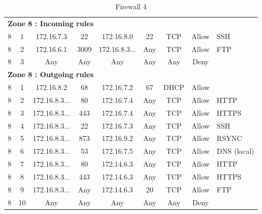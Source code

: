 \documentclass[a4paper,titlepage]{article}
\begin{document}
\begin{landscape}
\begin{table}[h]
\begin{tabular}{c|c|cc|cc|ccl}
			\hline
			\multicolumn{9}{l}{\textbf{Zone 8 : Incoming rules}}\\
			8 & 1 & 172.16.7.3 & 22 & 172.16.8.0 & 22 & TCP & Allow & SSH \\
			8 & 2 & 172.16.6.1 & 3009 & 172.16.8.3... & Any & TCP & Allow & FTP \\
			8 & 3 & Any & Any & Any & Any & Any & Deny & \\
			\hline
			\multicolumn{9}{l}{\textbf{Zone 8 : Outgoing rules}}\\
			8 & 1 & 172.16.8.2 & 68 & 172.16.7.2 & 67 & DHCP & Allow & \\
			8 & 2 & 172.16.8.3... & 80 & 172.16.7.4 & Any & TCP & Allow & HTTP \\
			8 & 3 & 172.16.8.3... & 443 & 172.16.7.4 & Any & TCP & Allow & HTTPS \\
			8 & 4 & 172.16.8.3... & 22 & 172.16.7.3 & Any & TCP & Allow & SSH \\
			8 & 5 & 172.16.8.3... & 873 & 172.16.9.2 & Any & TCP & Allow & RSYNC \\
			8 & 6 & 172.16.8.3... & 53 & 172.16.7.5 & Any & TCP & Allow & DNS (local) \\
			8 & 7 & 172.16.8.3... & 80 & 172.14.6.3 & Any & TCP & Allow & HTTP \\
			8 & 8 & 172.16.8.3... & 443 & 172.14.6.3 & Any & TCP & Allow & HTTPS \\
			8 & 9 & 172.16.8.3... & Any & 172.14.6.3 & 20 & TCP & Allow & FTP \\
			8 & 10 & Any & Any & Any & Any & Any & Deny & \\
			\hline

		\end{tabular}
		\caption{Firewall 4}
	\end{table}
	\vspace*{\fill}
\end{landscape}
\end{document}
